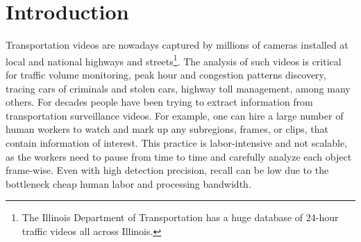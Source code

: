 \section{Introduction}
\label{sec:semantic-intro}

Transportation videos are nowadays captured by millions of cameras installed at local and national highways and streets\footnote{The Illinois Department of Transportation has a huge database of 24-hour traffic videos all across Illinois.}.
The analysis of such videos is critical for traffic volume monitoring, peak hour and congestion patterns discovery, tracing cars of criminals and stolen cars, highway toll management, among many others.
For decades people have been trying to extract information from transportation surveillance videos.
For example, one can hire a large number of human workers to watch and mark up any subregions, frames, or clips, that contain information of interest.
This practice is labor-intensive and not scalable,
as the workers need to pause from time to time and carefully analyze each object frame-wise.
Even with high detection precision, recall can be low due to the bottleneck cheap human labor and processing bandwidth.


